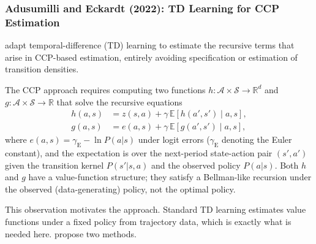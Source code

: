 


\subsubsection{Adusumilli and Eckardt (2022): TD Learning for CCP Estimation}

\citet{AdusumilliEckardt2022} adapt temporal-difference (TD) learning to estimate the recursive terms that arise in CCP-based estimation, entirely avoiding specification or estimation of transition densities.

The CCP approach requires computing two functions $h: \mathcal{A} \times \mathcal{S} \to \mathbb{R}^d$ and $g: \mathcal{A} \times \mathcal{S} \to \mathbb{R}$ that solve the recursive equations
\begin{align}
h(a,s) &= z(s,a) + \gamma \, \mathbb{E}[h(a', s') \mid a, s], \label{eq:ae_h}\\
g(a,s) &= e(a,s) + \gamma \, \mathbb{E}[g(a', s') \mid a, s], \label{eq:ae_g}
\end{align}
where $e(a,s) = \gamma_{\text{E}} - \ln P(a|s)$ under logit errors ($\gamma_{\text{E}}$ denoting the Euler constant), and the expectation is over the next-period state-action pair $(s', a')$ given the transition kernel $P(s'|s,a)$ and the observed policy $P(a|s)$. Both $h$ and $g$ have a value-function structure; they satisfy a Bellman-like recursion under the observed (data-generating) policy, not the optimal policy.

This observation motivates the approach. Standard TD learning estimates value functions under a fixed policy from trajectory data, which is exactly what is needed here. \citet{AdusumilliEckardt2022} propose two methods.

